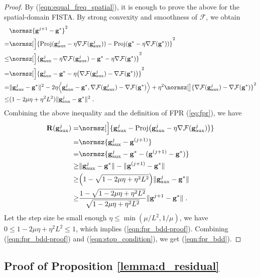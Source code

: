 \documentclass[final]{siamart1116}
\newcommand{\mb}[1]{\mathbf{#1}}
\def \F  {\mathcal{F}}
\def \fpr {\mathbf{R}}
\begin{document}
\begin{proof}
By (\ref{eqn:equal_freq_spatial}), it is enough to prove the above for the spatial-domain FISTA. By strong convexity and smoothness of $\F$, we obtain
\[
\begin{aligned}
&\normsz{\mb{g}^{j+1} - \mb{g}^*}^2\\
=& \normsz[\Big]{\text{Proj}(\mb{g}_{\text{aux}}^j - \eta \nabla \F(\mb{g}_{\text{aux}}^j)) - \text{Proj}(\mb{g}^* - \eta \nabla \F(\mb{g}^*)) }^2\\
\leq & \normsz[\Big]{\mb{g}_{\text{aux}}^j - \eta \nabla \F(\mb{g}_{\text{aux}}^j) - \mb{g}^* - \eta \nabla \F(\mb{g}^*) }^2\\
=&  \normsz[\Big]{\mb{g}_{\text{aux}}^j - \mb{g}^* - \eta \big( \nabla \F(\mb{g}_{\text{aux}}^j) - \nabla \F(\mb{g}^*) \big)}^2\\
=& \|\mb{g}_{\text{aux}}^j - \mb{g}^*\|^2 - 2\eta\Big\langle  \mb{g}_{\text{aux}}^j - \mb{g}^*, \nabla \F(\mb{g}_{\text{aux}}^j) - \nabla \F(\mb{g}^*)  \Big\rangle + \eta^2 \normsz[\big]{\nabla \F(\mb{g}_{\text{aux}}^j) - \nabla \F(\mb{g}^*)}^2\\
\leq & (1-2\mu\eta+ \eta^2L^2)\|\mb{g}_{\text{aux}}^j - \mb{g}^*\|^2 \;.
\end{aligned}
\]
Combining the above inequality and the definition of FPR (\ref{eq:fpr}), we have
\[
\begin{aligned}
\fpr(\mb{g}^{j}_{\text{aux}}) =& \normsz[\Big]{ \mb{g}^{j}_{\text{aux}} - \text{Proj}\big(\mb{g}^{j}_{\text{aux}} - \eta\nabla \F(\mb{g}^{j}_{\text{aux}})\big)}\\
=& \normsz{ \mb{g}^{j}_{\text{aux}} - \mb{g}^{(j+1)}}\\
=& \normsz{ \mb{g}^{j}_{\text{aux}} - \mb{g}^* - (\mb{g}^{(j+1)} - \mb{g}^* )}\\
\geq & \|\mb{g}^{j}_{\text{aux}} - \mb{g}^*\| - \|\mb{g}^{(j+1)} - \mb{g}^*\|\\
\geq & \Big(1-\sqrt{1-2\mu\eta + \eta^2L^2}\Big) \|\mb{g}^{j}_{\text{aux}} - \mb{g}^*\|\\
\geq & \frac{1-\sqrt{1-2\mu\eta + \eta^2L^2}}{\sqrt{1-2\mu\eta+ \eta^2L^2}}\|\mb{g}^{j+1} - \mb{g}^*\| \;.
\end{aligned}
\]
Let the step size be small enough $\eta \leq \min{(\mu/L^2,1/\mu)}$, we have $0\leq1-2\mu\eta+ \eta^2L^2\leq1$, which implies (\ref{eqn:fpr_bdd-proof}). Combining (\ref{eqn:fpr_bdd-proof}) and (\ref{eqn:stop_condition}), we get (\ref{eqn:fpr_bdd}).
\end{proof}


\subsection{Proof of Proposition \ref{lemma:d_residual}}
\label{app:lemma-d-residual}
\end{document}
